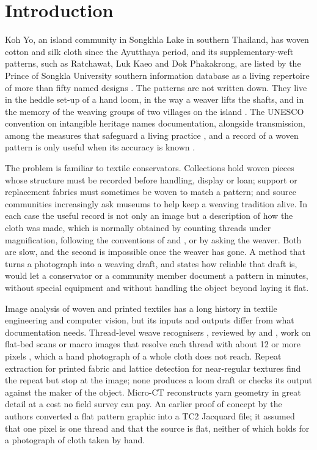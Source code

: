 \documentclass[12pt]{article}
\begin{document}
\section{Introduction}

Koh Yo, an island community in Songkhla Lake in southern Thailand, has woven cotton and silk cloth since the Ayutthaya period, and its supplementary-weft patterns, such as Ratchawat, Luk Kaeo and Dok Phakakrong, are listed by the Prince of Songkla University southern information database as a living repertoire of more than fifty named designs \citep{psu_kohyo}. The patterns are not written down. They live in the heddle set-up of a hand loom, in the way a weaver lifts the shafts, and in the memory of the weaving groups of two villages on the island \citep{psu_kohyo,conway1992,prangwatthanakun1987}. The UNESCO convention on intangible heritage names documentation, alongside transmission, among the measures that safeguard a living practice \citep{unesco2003}, and a record of a woven pattern is only useful when its accuracy is known \citep{pavlidis2007}.

The problem is familiar to textile conservators. Collections hold woven pieces whose structure must be recorded before handling, display or loan; support or replacement fabrics must sometimes be woven to match a pattern; and source communities increasingly ask museums to help keep a weaving tradition alive. In each case the useful record is not only an image but a description of how the cloth was made, which is normally obtained by counting threads under magnification, following the conventions of \citet{emery1980} and \citet{burnham1980}, or by asking the weaver. Both are slow, and the second is impossible once the weaver has gone. A method that turns a photograph into a weaving draft, and states how reliable that draft is, would let a conservator or a community member document a pattern in minutes, without special equipment and without handling the object beyond laying it flat.

Image analysis of woven and printed textiles has a long history in textile engineering and computer vision, but its inputs and outputs differ from what documentation needs. Thread-level weave recognisers \citep{kang1999,kuo2004,xin2009,pan2011,hussain2020,meng2021}, reviewed by \citet{zhang2013} and \citet{zhang2016}, work on flat-bed scans or macro images that resolve each thread with about 12 or more pixels \citep{meng2021}, which a hand photograph of a whole cloth does not reach. Repeat extraction for printed fabric \citep{tavanai2006,kuo2008,xiang2020,xiang2022,ayyurek2026} and lattice detection for near-regular textures \citep{liu2004pami,liu2004siggraph,hays2006,park2009,liu2015,albert2015} find the repeat but stop at the image; none produces a loom draft or checks its output against the maker of the object. Micro-CT reconstructs yarn geometry in great detail \citep{ying2025,tang2024,cao2025} at a cost no field survey can pay. An earlier proof of concept by the authors converted a flat pattern graphic into a TC2 Jacquard file; it assumed that one pixel is one thread and that the source is flat, neither of which holds for a photograph of cloth taken by hand.
\end{document}
